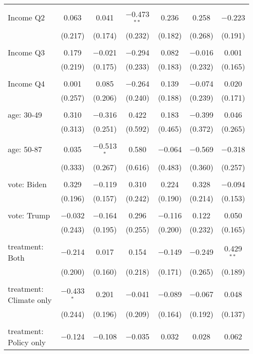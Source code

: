 \begin{tabular}{@{\extracolsep{5pt}}lcccccc}
  & & & & & & \\ 
 Income Q2 & 0.063 & 0.041 & $-$0.473$^{**}$ & 0.236 & 0.258 & $-$0.223 \\ 
  & (0.217) & (0.174) & (0.232) & (0.182) & (0.268) & (0.191) \\ 
  & & & & & & \\ 
 Income Q3 & 0.179 & $-$0.021 & $-$0.294 & 0.082 & $-$0.016 & 0.001 \\ 
  & (0.219) & (0.175) & (0.233) & (0.183) & (0.232) & (0.165) \\ 
  & & & & & & \\ 
 Income Q4 & 0.001 & 0.085 & $-$0.264 & 0.139 & $-$0.074 & 0.020 \\ 
  & (0.257) & (0.206) & (0.240) & (0.188) & (0.239) & (0.171) \\ 
  & & & & & & \\ 
 age: 30-49 & 0.310 & $-$0.316 & 0.422 & 0.183 & $-$0.399 & 0.046 \\ 
  & (0.313) & (0.251) & (0.592) & (0.465) & (0.372) & (0.265) \\ 
  & & & & & & \\ 
 age: 50-87 & 0.035 & $-$0.513$^{*}$ & 0.580 & $-$0.064 & $-$0.569 & $-$0.318 \\ 
  & (0.333) & (0.267) & (0.616) & (0.483) & (0.360) & (0.257) \\ 
  & & & & & & \\ 
 vote: Biden & 0.329 & $-$0.119 & 0.310 & 0.224 & 0.328 & $-$0.094 \\ 
  & (0.196) & (0.157) & (0.242) & (0.190) & (0.214) & (0.153) \\ 
  & & & & & & \\ 
 vote: Trump & $-$0.032 & $-$0.164 & 0.296 & $-$0.116 & 0.122 & 0.050 \\ 
  & (0.243) & (0.195) & (0.255) & (0.200) & (0.232) & (0.165) \\ 
  & & & & & & \\ 
 treatment: Both & $-$0.214 & 0.017 & 0.154 & $-$0.149 & $-$0.249 & 0.429$^{**}$ \\ 
  & (0.200) & (0.160) & (0.218) & (0.171) & (0.265) & (0.189) \\ 
  & & & & & & \\ 
 treatment: Climate only & $-$0.433$^{*}$ & 0.201 & $-$0.041 & $-$0.089 & $-$0.067 & 0.048 \\ 
  & (0.244) & (0.196) & (0.209) & (0.164) & (0.192) & (0.137) \\ 
  & & & & & & \\ 
 treatment: Policy only & $-$0.124 & $-$0.108 & $-$0.035 & 0.032 & 0.028 & 0.062 \\ 

\end{tabular}
